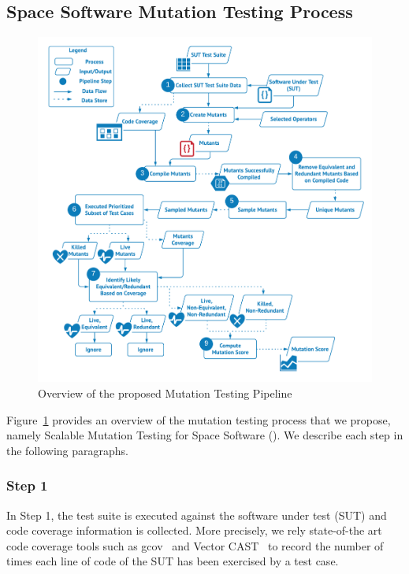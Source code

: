 \subsection{Space Software Mutation Testing Process}
\label{sec:approach}

\begin{figure}[h!]
\begin{center}
\includegraphics[width=\textwidth]{images/MT}
\caption{Overview of the proposed Mutation Testing Pipeline}
\label{fig:approach}
\end{center}
\end{figure}

Figure~\ref{fig:approach} provides an overview of the mutation testing process that we propose, namely Scalable Mutation Testing for Space Software  (\APPR). We describe each step in the following paragraphs. 

\subsubsection{Step 1}

In Step 1, the test suite is executed against the software under test (SUT) and code coverage information is collected. 
More precisely, we rely state-of-the art code coverage tools such as gcov~\cite{GCOV} and Vector CAST~\cite{VectorCAST} 
to record the number of times each line of code of the SUT has been exercised by a test case.

